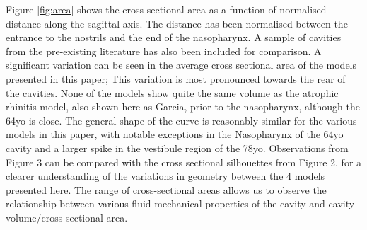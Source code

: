 Figure \ref{fig:area} shows the cross sectional area as a function of normalised distance along the sagittal axis. The distance has been normalised between the entrance to the nostrils and the end of the nasopharynx. A sample of cavities from the pre-existing literature has also been included for comparison. A significant variation can be seen in the average cross sectional area of the models presented in this paper; This variation is most pronounced towards the rear of the cavities. None of the models show quite the same volume as the atrophic rhinitis model, also shown here as Garcia, prior to the nasopharynx, although the 64yo is close. The general shape of the curve is reasonably similar for the various models in this paper, with notable exceptions in the Nasopharynx of the 64yo cavity and a larger spike in the vestibule region of the 78yo. Observations from Figure 3 can be compared with the cross sectional silhouettes from Figure 2, for a clearer understanding of the variations in geometry between the 4 models presented here. The range of cross-sectional areas allows us to observe the relationship between various fluid mechanical properties of the cavity and cavity volume/cross-sectional area.

